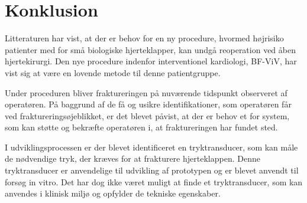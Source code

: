 \chapter{Konklusion}


Litteraturen har vist, at der er behov for en ny procedure, hvormed højrisiko patienter med for små biologiske hjerteklapper, kan undgå reoperation ved åben hjertekirurgi. Den nye procedure indenfor interventionel kardiologi, BF-ViV, har vist sig at være en lovende metode til denne patientgruppe. 

Under proceduren bliver fraktureringen på nuværende tidspunkt observeret af operatøren. På baggrund af de få og usikre identifikationer, som operatøren får ved fraktureringsøjeblikket, er det blevet påvist, at der er behov et for system, som kan støtte og bekræfte operatøren i, at fraktureringen har fundet sted. 

I udviklingsprocessen er der blevet identificeret en tryktransducer, som kan måle de nødvendige tryk, der kræves for at frakturere hjerteklappen. Denne tryktransducer er anvendelige til udvikling af prototypen og er blevet anvendt til forsøg in vitro. Det har dog ikke været muligt at finde et tryktransducer, som kan anvendes i klinisk miljø og opfylder de tekniske egenskaber. 

